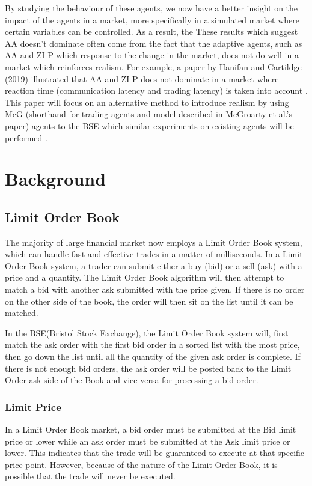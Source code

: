 By studying the behaviour of these agents, we now have a better insight on the impact of the agents in a market, more specifically in a simulated market where certain variables can be controlled. As a result, the These results which suggest AA doesn’t dominate often come from the fact that the adaptive agents, such as AA and ZI-P which response to the change in the market, does not do well in a market which reinforces realism. For example, a paper by Hanifan and Cartildge (2019) illustrated that  AA and ZI-P does not dominate in a market where reaction time (communication latency and trading latency) is taken into account \cite{foolsrush}. This paper will focus on an alternative method to introduce realism by using McG (shorthand for trading agents and model described in McGroarty et al.'s paper) agents to the BSE which similar experiments on existing agents will be performed \cite{McGroarty}. 

\section{Background}
\subsection{Limit Order Book}
The majority of large financial market now employs a Limit Order Book system, which can handle fast and effective trades in a matter of milliseconds. In a Limit Order Book system, a trader can submit either a buy (bid) or a sell (ask) with a price and a quantity. The Limit Order Book algorithm will then attempt to match a bid with another ask submitted with the price given. If there is no order on the other side of the book, the order will then sit on the list until it can be matched. 

In the BSE(Bristol Stock Exchange), the Limit Order Book system will, first match the ask order with the first bid order in a sorted list with the most price, then go down the list until all the quantity of the given ask order is complete. If there is not enough bid orders, the ask order will be posted back to the Limit Order ask side of the Book and vice versa for processing a bid order.

\subsubsection{Limit Price}
In a Limit Order Book market, a bid order must be submitted at the Bid limit price or lower while an ask order must be submitted at the Ask limit price or lower. This indicates that the trade will be guaranteed to execute at that specific price point. However, because of the nature of the Limit Order Book, it is possible that the trade will never be executed. 


